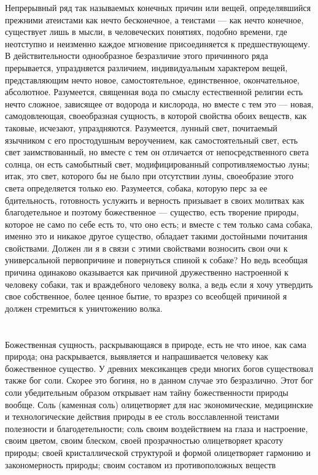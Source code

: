 \documentclass[12pt]{article}
\begin{document}
Непрерывный ряд так называемых конечных причин или вещей, определявшийся прежними атеистами как нечто бесконечное, а теистами --- как нечто конечное, существует лишь в мысли, в человеческих понятиях, подобно времени, где неотступно и неизменно каждое мгновение присоединяется к предшествующему. В действительности однообразное безразличие этого причинного ряда прерывается, упраздняется различием, индивидуальным характером вещей, представляющим нечто новое, самостоятельное, единственное, окончательное, абсолютное. Разумеется, священная вода по смыслу естественной религии есть нечто сложное, зависящее от водорода и кислорода, но вместе с тем это --- новая, самодовлеющая, своеобразная сущность, в которой свойства обоих веществ, как таковые, исчезают, упраздняются. Разумеется, лунный свет, почитаемый язычником с его простодушным вероучением, как самостоятельный свет, есть свет заимствованный, но вместе с тем он отличается от непосредственного света солнца, он есть самобытный свет, модифицированный сопротивляемостью луны; итак, это свет, которого бы не было при отсутствии луны, своеобразие этого света определяется только ею. Разумеется, собака, которую перс за ее бдительность, готовность услужить и верность призывает в своих молитвах как благодетельное и поэтому божественное --- существо, есть творение природы, которое не само по себе есть то, что оно есть; и вместе с тем только сама собака, именно это и никакое другое существо, обладает такими достойными почитания свойствами. Должен ли я в связи с этими свойствами возносить свои очи к универсальной первопричине и повернуться спиной к собаке? Но ведь всеобщая причина одинаково оказывается как причиной дружественно настроенной к человеку собаки, так и враждебного человеку волка, а ведь если я хочу утвердить свое собственное, более ценное бытие, то вразрез со всеобщей причиной я должен стремиться к уничтожению волка.



\section{}

Божественная сущность, раскрывающаяся в природе, есть не что иное, как сама природа; она раскрывается, выявляется и напрашивается человеку как божественное существо. У древних мексиканцев среди многих богов существовал также бог соли. Скорее это богиня, но в данном случае это безразлично. Этот бог соли убедительным образом открывает нам тайну божественности природы вообще. Соль (каменная соль) олицетворяет для нас экономические, медицинские и технологические действия природы в ее столь восславленной теистами полезности и благодетельности; соль своим воздействием на глаза и настроение, своим цветом, своим блеском, своей прозрачностью олицетворяет красоту природы; своей кристаллической структурой и формой олицетворяет гармонию и закономерность природы; своим составом из противоположных веществ
\end{document}
